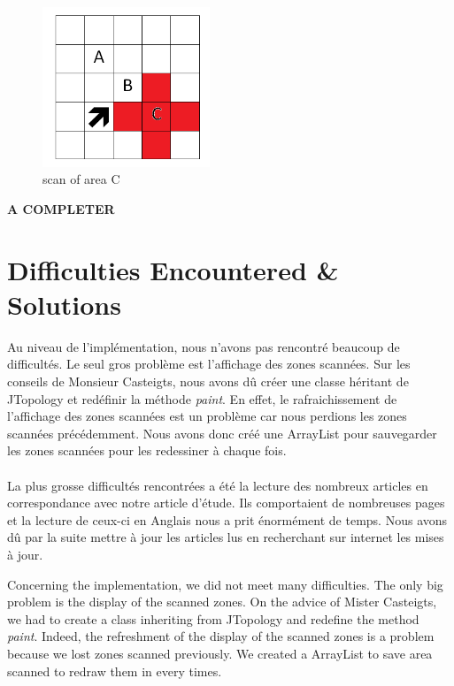 \begin{figure}[h]
\center
\includegraphics[width=5cm]{../images/grille_case_2_scan.png}
\caption{scan of area C}
\end{figure}

\textbf{A COMPLETER}



\section{Difficulties Encountered \& Solutions}

Au niveau de l'implémentation, nous n'avons pas rencontré beaucoup de difficultés. Le seul gros problème est l'affichage des zones scannées. Sur les conseils de Monsieur Casteigts, nous avons dû créer une classe héritant de JTopology et redéfinir la méthode \textit{paint}. En effet, le rafraichissement de l'affichage des zones scannées est un problème car nous perdions les zones scannées précédemment. Nous avons donc créé une ArrayList pour sauvegarder les zones scannées pour les redessiner à chaque fois.\\\\

La plus grosse difficultés rencontrées a été la lecture des nombreux articles en correspondance avec notre article d'étude. Ils comportaient de nombreuses pages et la lecture de ceux-ci en Anglais nous a prit énormément de temps. Nous avons dû par la suite mettre à jour les articles lus en recherchant sur internet les mises à jour.

Concerning the implementation, we did not meet many difficulties. The only big problem is the display of the scanned zones. On the advice of Mister Casteigts, we had to create a class inheriting from JTopology and redefine the method \textit{paint}. Indeed, the refreshment of the display of the scanned zones is a problem because we lost zones scanned previously. We created a ArrayList to save area scanned to redraw them in every times. \\\\
